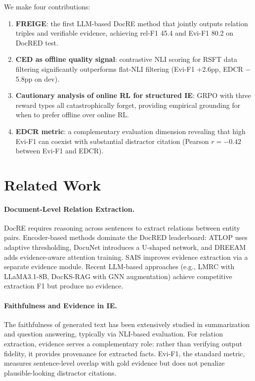 \documentclass[11pt,a4paper]{article}
\newcommand{\method}{FREIGE}
\newcommand{\ced}{CED}
\newcommand{\edcr}{EDCR}
\begin{document}
We make four contributions:
\begin{enumerate}[nosep,leftmargin=*]
\item \textbf{\method{}}: the first LLM-based DocRE method that jointly outputs relation triples and verifiable evidence, achieving rel-F1 45.4 and Evi-F1 80.2 on DocRED test.
\item \textbf{\ced{} as offline quality signal}: contrastive NLI scoring for RSFT data filtering significantly outperforms flat-NLI filtering (Evi-F1 +2.6pp, EDCR $-$5.8pp on dev).
\item \textbf{Cautionary analysis of online RL for structured IE}: GRPO with three reward types all catastrophically forget, providing empirical grounding for when to prefer offline over online RL.
\item \textbf{\edcr{} metric}: a complementary evaluation dimension revealing that high Evi-F1 can coexist with substantial distractor citation (Pearson $r = -0.42$ between Evi-F1 and EDCR).
\end{enumerate}

\section{Related Work}

\paragraph{Document-Level Relation Extraction.}
DocRE requires reasoning across sentences to extract relations between entity pairs. Encoder-based methods dominate the DocRED leaderboard: ATLOP uses adaptive thresholding, DocuNet introduces a U-shaped network, and DREEAM adds evidence-aware attention training. SAIS improves evidence extraction via a separate evidence module. Recent LLM-based approaches (e.g., LMRC with LLaMA3.1-8B, DocKS-RAG with GNN augmentation) achieve competitive extraction F1 but produce no evidence.

\paragraph{Faithfulness and Evidence in IE.}
The faithfulness of generated text has been extensively studied in summarization and question answering, typically via NLI-based evaluation. For relation extraction, evidence serves a complementary role: rather than verifying output fidelity, it provides provenance for extracted facts. Evi-F1, the standard metric, measures sentence-level overlap with gold evidence but does not penalize plausible-looking distractor citations.
\end{document}
